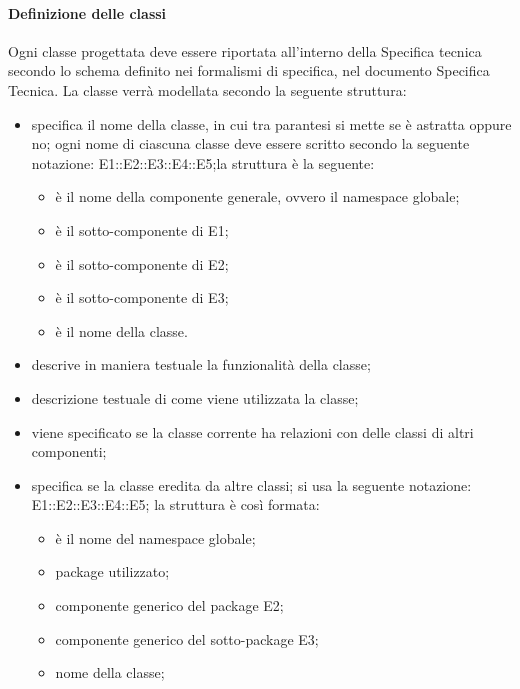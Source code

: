 \paragraph{Definizione delle classi \\}
\label{}
Ogni classe progettata deve essere riportata all'interno della Specifica tecnica secondo lo schema definito nei formalismi di specifica, nel documento Specifica Tecnica. La classe verrà modellata secondo la seguente struttura:
\begin{itemize}
\item {}specifica il nome della classe, in cui tra parantesi si mette se è astratta oppure no; ogni nome di ciascuna classe deve essere scritto secondo la seguente notazione: E1::E2::E3::E4::E5;la struttura è la seguente: 
\begin{itemize}
\item {}è il nome della componente generale, ovvero il namespace globale;
\item {}è il sotto-componente di E1;
\item {}è il sotto-componente di E2;
\item {}è il sotto-componente di E3; 
\item {}è il nome della classe.
\end{itemize}
\item {}descrive in maniera testuale la funzionalità della classe;
\item {}descrizione testuale di come viene utilizzata la classe;
\item {}viene specificato se la classe corrente ha relazioni con delle classi di altri componenti;
\item {}specifica se la classe eredita da altre classi; si usa la seguente notazione: E1::E2::E3::E4::E5; la struttura è così formata:
	\begin{itemize}
	\item {}è il nome del namespace globale;
	\item {}package utilizzato;
	\item {}componente generico del package E2;
	\item {}componente generico del sotto-package E3;
	\item {}nome della classe;

\end{itemize}
\end{itemize}
